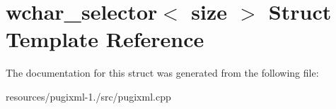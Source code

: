 \hypertarget{structwchar__selector}{\section{wchar\+\_\+selector$<$ size $>$ Struct Template Reference}
\label{structwchar__selector}
}


The documentation for this struct was generated from the following file\+:\begin{DoxyCompactItemize}
\item 
resources/pugixml-\/1./src/pugixml.\+cpp\end{DoxyCompactItemize}
